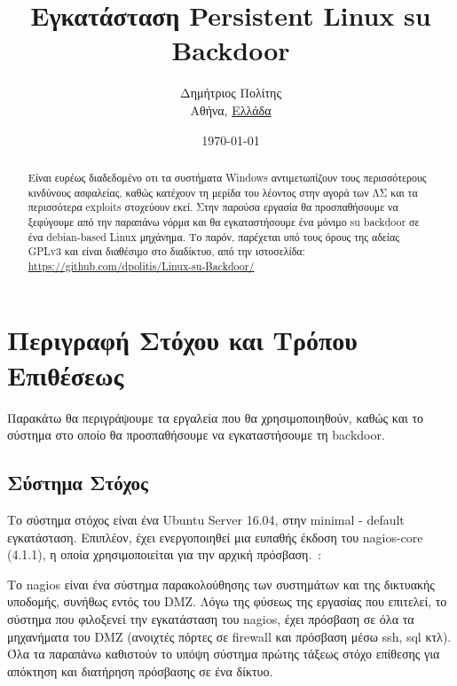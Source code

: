 \documentclass[12pt]{report}
\begin{document}

\title{Εγκατάσταση \textlatin{Persistent Linux su Backdoor}}
\author{
        Δημήτριος Πολίτης\\
        Αθήνα, \underline{Ελλάδα}
}
\date{\today}

\hypersetup{pageanchor=false}

\maketitle

\tableofcontents

\begin{abstract}
Είναι ευρέως διαδεδομένο οτι τα συστήματα \textlatin{Windows} αντιμετωπίζουν τους περισσότερους κινδύνους ασφαλείας, καθώς κατέχουν τη μερίδα του λέοντος στην αγορά των ΛΣ και τα περισσότερα \textlatin{exploits} στοχεύουν εκεί. Στην παρούσα εργασία θα προσπαθήσουμε να ξεφύγουμε από την παραπάνω νόρμα και θα εγκαταστήσουμε ένα μόνιμο \textlatin{su backdoor} σε ένα \textlatin{debian-based Linux} μηχάνημα. Το παρόν, παρέχεται υπό τους όρους της αδείας \textlatin{GPLv3} και είναι διαθέσιμο στο διαδίκτυο, από την ιστοσελίδα: \textlatin{\url{https://github.com/dpolitis/Linux-su-Backdoor/}}
\end{abstract}

\chapter{Περιγραφή Στόχου και Τρόπου Επιθέσεως}
\hypersetup{pageanchor=true}

Παρακάτω θα περιγράψουμε τα εργαλεία που θα χρησιμοποιηθούν, καθώς και το σύστημα στο οποίο θα προσπαθήσουμε να εγκαταστήσουμε τη \textlatin{backdoor}.

\section{Σύστημα Στόχος}
Το σύστημα στόχος είναι ένα \textlatin{Ubuntu Server 16.04}, στην \textlatin{minimal - default} εγκατάσταση. Επιπλέον, έχει ενεργοποιηθεί μια ευπαθής έκδοση του \textlatin{nagios-core (4.1.1)}, η οποία χρησιμοποιείται για την αρχική πρόσβαση.~\cite{exploit:01}:

Το \textlatin{nagios} είναι ένα σύστημα παρακολούθησης των συστημάτων και της δικτυακής υποδομής, συνήθως εντός του \textlatin{DMZ}. Λόγω της φύσεως της εργασίας που επιτελεί, το σύστημα που φιλοξενεί την εγκατάσταση του \textlatin{nagios}, έχει πρόσβαση σε όλα τα μηχανήματα του \textlatin{DMZ} (ανοιχτές πόρτες σε \textlatin{firewall} και πρόσβαση μέσω \textlatin{ssh, sql} κτλ). Όλα τα παραπάνω καθιστούν το υπόψη σύστημα πρώτης τάξεως στόχο επίθεσης για απόκτηση και διατήρηση πρόσβασης σε ένα δίκτυο.
\end{document}
